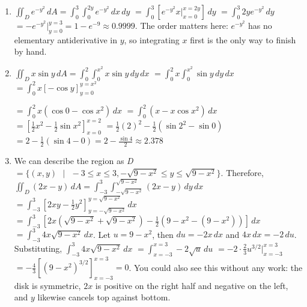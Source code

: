 \begin{Answer}[ref = non-rect]
\begin{enumerate}
    \item $\iint_{\textit{D}} e^{-y^2} \,dA = \int_0^3 \int_{0}^{2y} e^{-y^2}\,
    dx\,dy$ $= \int_0^3 \left[ e^{-y^2} x|_{x = 0}^{x = 2y} \right]\,dy$ $= 
    \int_0^3 2y e^{-y^2}\,dy$ $= -e^{-y^2}|_{y = 0}^{y = 3} = 1 - e^{-9} 
    \approx 0.9999$. The order matters here: $e^{-y^2}$ has no elementary
    antiderivative in $y$, so integrating $x$ first is the only way to finish by hand.

    \item $\iint_{\textit{D}} x \sin{y}\,dA = \int_0^{2} \int_0^{x^2} x \sin{y}
    \,dy\,dx$ $= \int_0^{2} x \int_0^{x^2} \sin{y}\,dy\,dx$ $= \int_0^{2} x 
    \left[ -\cos{y} \right]_{y = 0}^{y = x^2}$ 
    
    $= \int_0^{2} x \left( \cos{0} -\cos{x^2} \right)\,dx$ $= \int_0^{2} \left(
    x - x\cos{x^2} \right)\,dx$ $= \left[ \frac{1}{2}x^2 - \frac{1}{2}\sin{x^2}
    \right]_{x = 0}^{x = 2}$ $= \frac{1}{2}(2)^2 - \frac{1}{2} \left( \sin{2^2}
    - \sin{0} \right)$ $= 2 - \frac{1}{2} \left( \sin{4} - 0 \right) = 2 - 
    \frac{\sin{4}}{2} \approx 2.378$

    \item We can describe the region as \textit{D} $= \{ (x, y) \text{ } | 
    \text{ } -3 \leq x \leq 3, -\sqrt{9 - x^2} \leq y \leq \sqrt{9 - x^2} \}$.
    Therefore, $\iint_{\textit{D}} \left(2x - y \right)\,dA = \int_{-3}^3
    \int_{-\sqrt{9 - x^2}}^{\sqrt{9 - x^2}} \left( 2x - y \right)\,dy\,dx$ $= 
    \int_{-3}^3 \left[ 2xy - \frac{1}{2}y^2 \right]_{y = -\sqrt{9 - x^2}}^{y = 
    \sqrt{9 - x^2}}\,dx$ $= \int_{-3}^3 \left[ 2x \left( \sqrt{9 - x^2} + 
    \sqrt{9 - x^2} \right) - \frac{1}{2} \left( 9 - x^2 - \left(9 - x^2 \right) 
    \right) \right]\,dx$ $= \int_{-3}^3 4x\sqrt{9 - x^2}\,dx$. Let $u = 9 - 
    x^2$, then $du = -2x\,dx$ and $4x\,dx = -2\,du$. Substituting, $\int_{-3}^3 4x\sqrt{
    9 - x^2}\,dx$ $= \int_{x = -3}^{x = 3} -2\sqrt{u}\,du$ $= -2 \cdot 
    \frac{2}{3} u^{3/2}|_{x = -3}^{x = 3}$ $= -\frac{4}{3} \left[ \left( 9 - 
    x^2 \right)^{3/2} \right]_{x = -3}^{x = 3} = 0$. You could also see this
    without any work: the disk is symmetric, $2x$ is positive on the right half and
    negative on the left, and $y$ likewise cancels top against bottom.
\end{enumerate}
\end{Answer}
